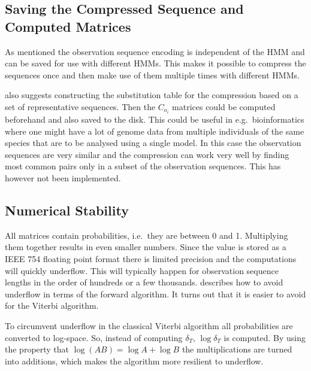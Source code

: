 \subsection{Saving the Compressed Sequence and Computed Matrices}
\label{sec:saving-compr-sequ}

As mentioned the observation sequence encoding is independent of the HMM and
can be saved for use with different HMMs. This makes it possible to compress
the sequences once and then make use of them multiple times
with different HMMs.

\citet{lifshits2009speeding} also suggests constructing the substitution table
for the compression based on a set of representative sequences. Then the
$C_{o_i}$ matrices could be computed beforehand and also saved to the disk.
This could be useful in e.g.\ bioinformatics where one might have a lot of
genome data from multiple individuals of the same species that are to be
analysed using a single model. In this case the observation sequences are very
similar and the compression can work very well by finding most common pairs
only in a subset of the observation sequences. This has however not been
implemented.

\subsection{Numerical Stability}

All matrices contain probabilities, i.e.\ they are between 0 and 1. Multiplying
them together results in even smaller numbers. Since the value is stored as a
IEEE 754 floating point format there is limited precision and the computations
will quickly underflow. This will typically happen for observation sequence
lengths in the order of hundreds or a few thousands. \citet{sand2013ziphmmlib}
describes how to avoid underflow in terms of the forward algorithm. It turns
out that it is easier to avoid for the Viterbi algorithm.

To circumvent underflow in the classical Viterbi algorithm all probabilities
are converted to log-space. So, instead of computing $\delta_T$,
$\log \delta_T$ is computed. By using the property that
$\log(AB) = \log A + \log B$ the multiplications are turned into additions,
which makes the algorithm more resilient to underflow. 

